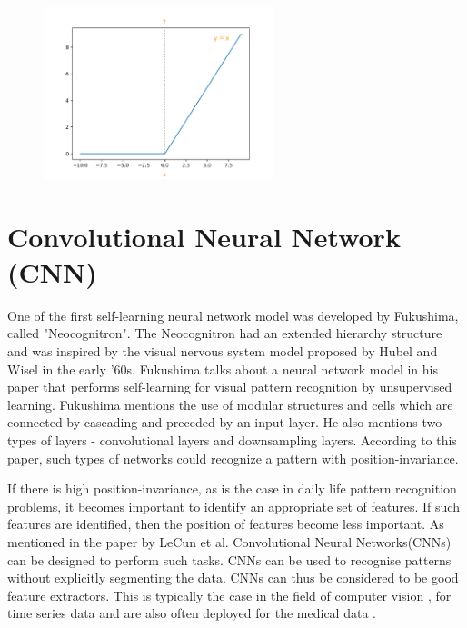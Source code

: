 \begin{figure}[ht]
  \centering
  \includegraphics[width=0.8\linewidth, height=5cm]{BachelorMasterThesis/TheoreticalBackground/Figures/Relu_Activation.png}
  \label{fig:ReLU_fn}
\end{figure}

\clearpage
\section{Convolutional Neural Network (CNN)}

One of the first self-learning neural network model was developed by Fukushima, called "Neocognitron"\cite{fukushima1980neocognitron}. The Neocognitron had an extended hierarchy structure and was inspired by the visual nervous system model proposed by Hubel and Wisel in the early '60s. Fukushima talks about a neural network model in his paper that performs self-learning for visual pattern recognition by unsupervised learning. Fukushima mentions the use of modular structures and cells which are connected by cascading and preceded by an input layer. He also mentions two types of layers -  convolutional layers and downsampling layers. According to this paper, such types of networks could recognize a pattern with position-invariance.

If there is high position-invariance, as is the case in daily life pattern recognition problems, it becomes important to identify an appropriate set of features. If such features are identified, then the position of features become less important. As mentioned in the paper by LeCun et al. \cite{lecun1999object} Convolutional Neural Networks(CNNs) can be designed to perform such tasks. CNNs can be used to recognise patterns without explicitly segmenting the data. CNNs can thus be considered to be good feature extractors. This is typically the case in the field of computer vision \cite{athiwaratkun2015feature}, for time series data \cite{yang2015deep} and are also often deployed for the medical data \cite{pyakillya2017deep}.

